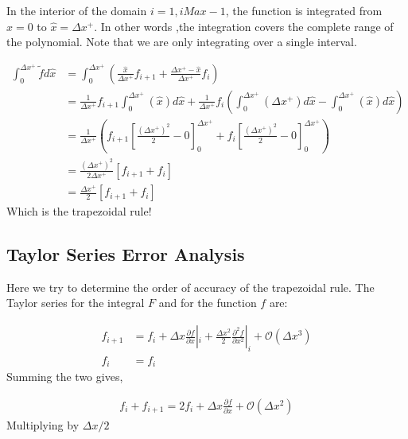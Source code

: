 \documentclass[12pt]{article}
\begin{document}
In the interior of the domain $i = 1, iMax - 1$, the function is integrated 
from $\hat{x} = 0$ to $\hat{x} = \Delta x^+$. In other words ,the integration 
covers the complete range of the polynomial. Note that we are only integrating
over a single interval.

\begin{align*}
    \int_0^{\Delta x^+} \widetilde{f} d\hat{x}&=
    \int_0^{\Delta x^+}
    \left( 
        \frac{\hat{x}}{\Delta x^+}f_{i+1} +
        \frac{\Delta x^+ - \hat{x}}{\Delta x^+}f_i
\right) \\ &= 
\frac{1}{\Delta x^+}f_{i+1}
\int_{0}^{\Delta x^+} 
\left(\hat{x}  \right) d\hat{x}
+
\frac{1}{\Delta x^+}
f_{i}
\left(
    \int_{0}^{\Delta x^+} 
    \left( \Delta x^+  \right) d\hat{x}
    -
    \int_{0}^{\Delta x^+} 
    \left( 
        \hat{x}
    \right) d\hat{x}
\right)\\
           &=\frac{1}{\Delta x^+}
           \left( 
               f_{i+1}\left[ 
                   \frac{\left( \Delta x^+ \right)^2}{
                   2} - 0
               \right]_0^{\Delta x^+}
               +
               f_i
               \left[ 
\frac{\left( \Delta x^+ \right)^2}{
                   2} - 0
               \right]_0^{\Delta x^+}
           \right) \\ &=
           \frac{\left( \Delta x^+ \right)^2}{2 \Delta x^+}
           \left[ f_{i+1} +f_i\right] \\
           &= 
           \frac{\Delta x^+}{2 }
           \left[ f_{i+1} +f_i\right] 
\end{align*}
Which is the trapezoidal rule!
\subsection{Taylor Series Error Analysis}

Here we try to determine the order of accuracy of the trapezoidal rule. 
The Taylor series for the integral $F$ and for the function $f$ are:

\begin{align*}
    f_{i+1} &= f_i +
    \Delta x \frac{\partial f}{\partial x}|_i +
    \frac{\Delta x^2}{2} \frac{\partial^2 f}{\partial x^2}|_i +
    \mathcal{O}\left( \Delta x^3 \right) \\
    f_i &= f_i
\end{align*}
Summing the two gives,

\begin{align*}
f_i + f_{i+1} = 2 f_i  + \Delta x \frac{\partial f}{\partial x } +
\mathcal{O}\left( \Delta x^2 \right) 
\end{align*}
Multiplying by $\Delta x /2  $
\end{document}
